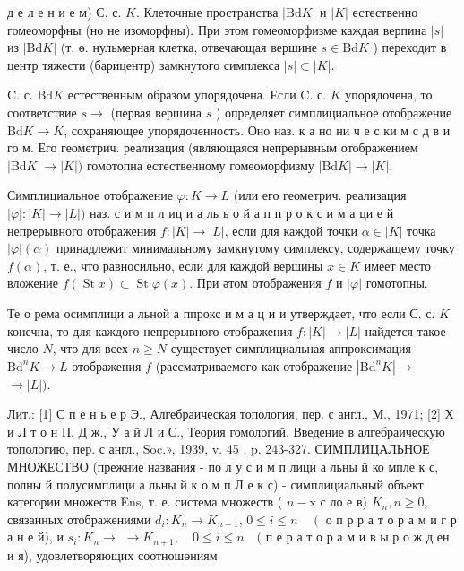 \documentclass[10pt]{article}
\begin{document}
д е л е н и е м) С. с. $K$. Клеточные пространства $|\mathrm{Bd} K|$ и $|K|$ естественно гомеоморфны (но не изоморфны). При этом гомеоморфизме каждая верпина $|s|$ из $|\mathrm{Bd} K|$ (т. ө. нульмерная клетка, отвечающая вершине $s \in \mathrm{Bd} K$ ) переходит в центр тяжести (барицентр) замкнутого симплекса $|s| \subset|K|$.



C. с. $\mathrm{Bd} K$ естественным образом упорядочена. Если C. с. $K$ упорядочена, то соответствие $s \rightarrow$ (первая вершина $s$ ) определяет симплициальное отображение $\mathrm{Bd} K \rightarrow K$, сохраняющее упорядоченность. Оно наз. к а но ни ч е с ки м с д в и го м. Его геометрич. реализация (являющаяся непрерывным отображением $|\mathrm{Bd} K| \rightarrow|K|)$ гомотопна естественному гомеоморфизму $|\mathrm{Bd} K| \rightarrow|K|$.



Симплициальное отображение $\varphi: K \rightarrow L$ (или его геометрич. реализация $|\varphi|:|K| \rightarrow|L|)$ наз. с и м п л иц и а ль ь о й а п п р о к с и м а ци е й непрерывного отображения $f:|K| \rightarrow|L|$, если для каждой точки $\alpha \in|K|$ точка $|\varphi|(\alpha)$ принадлежит минимальному замкнутому симплексу, содержащему точку $f(\alpha)$, т. е., что равносильно, если для каждой вершины $x \in K$ имеет место вложение $f(\operatorname{St} x) \subset \operatorname{St} \varphi(x)$. При әтом отображения $f$ и $|\varphi|$ гомотопны.



Те о рема осимплици а льной а ппрокс и м а ц и и утверждает, что если С. с. $K$ конечна, то для каждого непрерывного отображения $f:|K| \rightarrow|L|$ найдется такое число $N$, что для всех $n \geqslant N$ существует симплициальная аппроксимация $\mathrm{Bd}^{n} K \rightarrow L$ отображения $f$ (рассматриваемого как отображение $\left|\mathrm{Bd}^{n} K\right| \rightarrow$ $\rightarrow|L|)$.



Лит.: [1] С п е н ь е р Э., Алгебраическая топология, пер. с англ., М., 1971; [2] Х и Л т о н П. Д ж., У а й Л и С., Теория гомологий. Введение в алгебраическую топологию, пер. с англ., Soc.», 1939, v. 45 , p. 243-327. СИМПЛИЦАЛЬНОЕ МНОЖЕСТВО (прежние названия - по л у с и м п лици а льны й ко мпле к с, полны й полусимплици а льны й к о м п Л е к с) - симплициальный объект категории множеств Ens, т. е. система множеств ( $n-\mathrm{x}$ с ло е в) $K_{n}, n \geqslant 0$, связанных отображениями $d_{i}: K_{n} \rightarrow K_{n-1}$, $0 \leqslant i \leqslant n \quad\left(\right.$ о п р р а т о р а м и г р а н е й), и $s_{i}: K_{n} \rightarrow$ $\rightarrow K_{n+1}, \quad 0 \leqslant i \leqslant n \quad($ п е р а т о р а м и в ы р о ж д ен и я), удовлетворяющих соотношөниям
\end{document}
